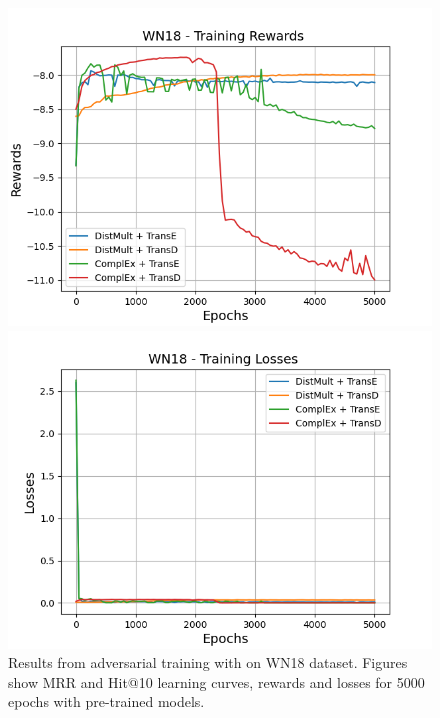 \begin{figure}
    \begin{minipage}{.45\textwidth}
      \centering
      \includegraphics[width=0.9\linewidth]{figures/results/gan_train/pretrained/uncertainty/max/entropy/wn18/5k_epochs/uncertainty_wn18_rew.png}
    \end{minipage}%
     \begin{minipage}{.45\textwidth}
      \centering
      \includegraphics[width=0.9\linewidth]{figures/results/gan_train/pretrained/uncertainty/max/entropy/wn18/5k_epochs/uncertainty_wn18_losses.png}
    \end{minipage}%
    \caption{Results from adversarial training with \usmax on \textsc{WN18} dataset.
    Figures show MRR and Hit@10 learning curves, rewards and losses for 5000 epochs with pre-trained models.}
    \label{fig:gan_train_pretrained_usmax_wn18}
\end{figure}
